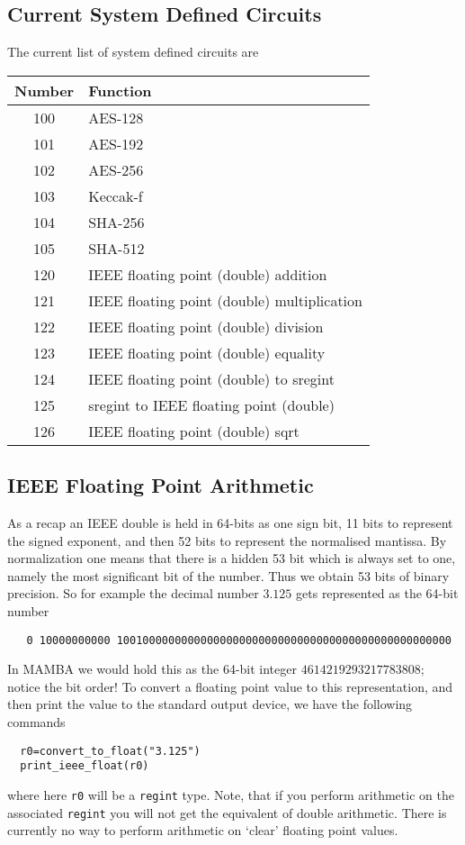 \subsection{Current System Defined Circuits}
The current list of system defined circuits are
\begin{center}
\begin{tabular}{c|l}
Number & Function \\
\hline
100 & AES-128 \\
101 & AES-192 \\
102 & AES-256 \\
103 & Keccak-f \\
104 & SHA-256 \\
105 & SHA-512 \\
\hline
120 & IEEE floating point (double) addition \\
121 & IEEE floating point (double) multiplication \\
122 & IEEE floating point (double) division \\
123 & IEEE floating point (double) equality \\
124 & IEEE floating point (double)  to sregint \\
125 & sregint to IEEE floating point (double) \\
126 & IEEE floating point (double) sqrt \\
\hline
\end{tabular}
\end{center}

\subsection{IEEE Floating Point Arithmetic}
\label{sec:ieee}
As a recap an IEEE double is held in 64-bits as one sign bit,
11 bits to represent the signed exponent, and then 52
bits to represent the normalised mantissa. By normalization
one means that there is a hidden 53 bit which is always set
to one, namely the most significant bit of the number.
Thus we obtain 53 bits of binary precision.
So for example the decimal number $3.125$ gets represented as
the 64-bit number
\begin{lstlisting}
   0 10000000000 1001000000000000000000000000000000000000000000000000
\end{lstlisting}
In MAMBA we would hold this as the 64-bit integer $4614219293217783808$; notice
the bit order!
To convert a floating point value to this representation, and then print
the value to the standard output device, we have the following
commands
\begin{lstlisting}
  r0=convert_to_float("3.125")
  print_ieee_float(r0)
\end{lstlisting}
where here \verb|r0| will be a \verb|regint| type.
Note, that if you perform arithmetic on the associated \verb|regint|
you will not get the equivalent of double arithmetic.
There is currently no way to perform arithmetic on `clear'
floating point values.

